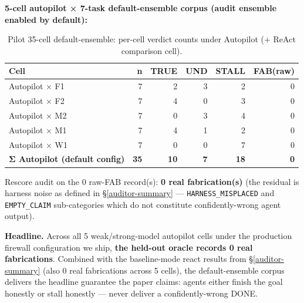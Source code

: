 \textbf{5-cell autopilot × 7-task default-ensemble corpus (audit ensemble enabled by default):}

{\scriptsize\begin{longtable}[]{@{}lrrrrr@{}}
\caption{Pilot 35-cell default-ensemble: per-cell verdict counts under Autopilot ($+$ ReAct comparison cell).}\label{tab:pilot-35cell}\\
\toprule\noalign{}
Cell & n & TRUE & UND & STALL & FAB(raw) \\
\midrule\noalign{}
\endhead
\bottomrule\noalign{}
\endlastfoot
Autopilot × F1 & 7 & 2 & 3 & 2 & 0 \\
Autopilot × F2 & 7 & 4 & 0 & 3 & 0 \\
Autopilot × M2 & 7 & 0 & 3 & 4 & 0 \\
Autopilot × M1 & 7 & 4 & 1 & 2 & 0 \\
Autopilot × W1 & 7 & 0 & 0 & 7 & 0 \\
\textbf{Σ Autopilot (default config)} & \textbf{35} & \textbf{10} & \textbf{7} & \textbf{18} & \textbf{0} \\
\end{longtable}}

Rescore audit on the 0 raw-FAB record(s): \textbf{0 real fabrication(s)}
(the residual is harness noise as defined in \S\ref{auditor-summary} --- \texttt{HARNESS\_MISPLACED} and
\texttt{EMPTY\_CLAIM} sub-categories which do not constitute confidently-wrong agent output).

\textbf{Headline.} Across all 5 weak/strong-model autopilot cells under the production firewall
configuration we ship, \textbf{the held-out oracle records 0 real fabrications}. Combined with
the baseline-mode react results from \S\ref{auditor-summary} (also 0 real fabrications across 5 cells), the
default-ensemble corpus delivers the headline guarantee the paper claims: agents either
finish the goal honestly or stall honestly --- never deliver a confidently-wrong DONE.

